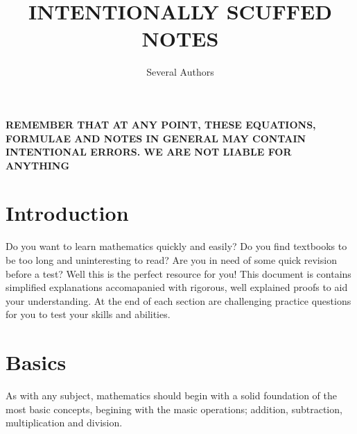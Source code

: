 \documentclass[a4paper]{article}
\theoremstyle{plain}
\theoremstyle{definition}
\theoremstyle{remark}
\newcommand{\sectionSpace}{\vspace{2em}} %
\begin{document}
\title{INTENTIONALLY SCUFFED NOTES}
\author{Several Authors}
\maketitle
{}
\newpage


\tableofcontents
{}
\newpage

\begin{center}
    \Large 
    \textbf{
        REMEMBER THAT AT ANY POINT, THESE EQUATIONS, FORMULAE AND NOTES IN GENERAL MAY CONTAIN INTENTIONAL ERRORS. WE ARE NOT LIABLE FOR ANYTHING} 
\end{center}

\sectionSpace
\section{Introduction}
    Do you want to learn mathematics quickly and easily? Do you find textbooks to be too long and uninteresting to read? Are you in need of some quick revision before a test? Well this is the perfect resource for you! This document is contains simplified explanations accomapanied with rigorous, well explained proofs to aid your understanding. At the end of each section are challenging practice questions for you to test your skills and abilities.

\sectionSpace
\section{Basics}
As with any subject, mathematics should begin with a solid foundation of the most basic concepts, begining with the masic operations; addition, subtraction, multiplication and division.
\end{document}
